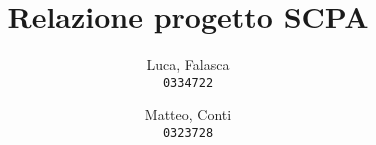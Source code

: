 \documentclass[10pt, a4paper]{article}
\title{Relazione progetto SCPA}
\author{Luca, Falasca\\
\texttt{0334722}
\and
Matteo, Conti\\
\texttt{0323728}
}
\begin{document}
\date{}
\maketitle
\end{document}
